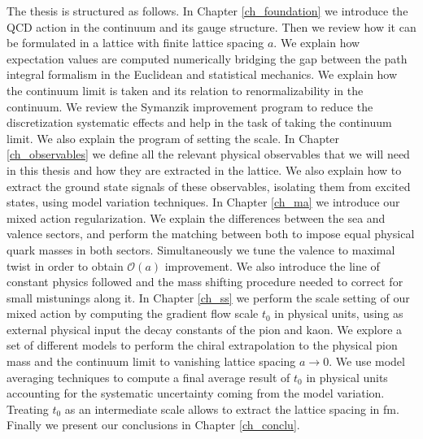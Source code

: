 The thesis is structured as follows. In Chapter \ref{ch_foundation} we introduce the QCD action in the continuum and its gauge structure. Then we review how it can be formulated in a lattice with finite lattice spacing $a$. We explain how expectation values are computed numerically bridging the gap between the path integral formalism in the Euclidean and statistical mechanics. We explain how the continuum limit is taken and its relation to renormalizability in the continuum. We review the Symanzik improvement program to reduce the discretization systematic effects and help in the task of taking the continuum limit. We also explain the program of setting the scale. In Chapter \ref{ch_observables} we define all the relevant physical observables that we will need in this thesis and how they are extracted in the lattice. We also explain how to extract the ground state signals of these observables, isolating them from excited states, using model variation techniques. In Chapter \ref{ch_ma} we introduce our mixed action regularization. We explain the differences between the sea and valence sectors, and perform the matching between both to impose equal physical quark masses in both sectors. Simultaneously we tune the valence to maximal twist in order to obtain $\mathcal{O}(a)$ improvement. We also introduce the line of constant physics followed and the mass shifting procedure needed to correct for small mistunings along it. In Chapter \ref{ch_ss} we perform the scale setting of our mixed action by computing the gradient flow scale $t_0$ in physical units, using as external physical input the decay constants of the pion and kaon. We explore a set of different models to perform the chiral extrapolation to the physical pion mass and the continuum limit to vanishing lattice spacing $a\to0$. We use model averaging techniques to compute a final average result of $t_0$ in physical units accounting for the systematic uncertainty coming from the model variation. Treating $t_0$ as an intermediate scale allows to extract the lattice spacing in fm. Finally we present our conclusions in Chapter \ref{ch_conclu}. 


